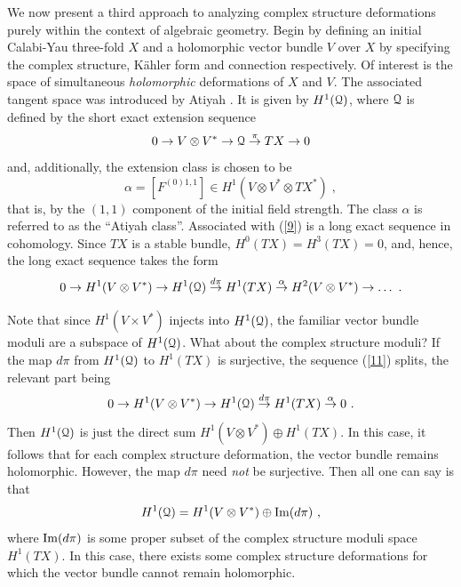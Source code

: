 \documentclass[12pt]{article}
\numberwithin{equation}{section}
\begin{document}
We now present a third approach to analyzing complex structure deformations purely within the context of algebraic geometry. Begin by defining an initial Calabi-Yau three-fold $X$ and a holomorphic vector bundle $V$ over $X$ by specifying the complex structure, K\"ahler form and connection  respectively. Of interest is the space of simultaneous {\it holomorphic} deformations of $X$ and $V$. The associated tangent space  was introduced by Atiyah \cite{Atiyah}.  It is given by $H^{1}({\cal{Q}})$, where $\cal{Q}$ is defined by the short exact extension sequence
%
\begin{equation}
0 \to V\otimes V^* \to {\cal Q} \stackrel{\pi}{\to} TX \to 0 
\label{9}
\end{equation}
%
and, additionally, the extension class is chosen to be
\begin{equation}
\alpha=[F^{(0)1,1}] \in H^1(V\otimes V^* \otimes TX^*)\; ,
\label{10}
\end{equation}
%
that is, by the $(1,1)$ component of the initial field strength. The class $\alpha$ is referred to as the ``Atiyah class''. Associated with (\ref{9}) is a long exact sequence in cohomology. Since $TX$ is a stable bundle, $H^0(TX)=H^3(TX)=0$, and, hence, the long exact sequence takes the form
%
\begin{equation}
0 \to H^1(V\otimes V^*) \to H^1({\cal Q}) \stackrel{d\pi}{\to} H^1(TX) \stackrel{\alpha}{\to} H^2(V\otimes V^*) \to \ldots  \ .
\label{11}
\end{equation}
%

Note that since $H^1(V\times V^*)$ injects into $H^1({\cal Q})$, the familiar vector bundle moduli are a subspace of $H^1({\cal Q})$. What about the complex structure moduli? If the map $d\pi$ from $H^1({\cal Q})$ to $H^1(TX)$ is surjective, the sequence (\ref{11}) splits, the relevant part being 
%
\begin{equation}
0 \to H^1(V\otimes V^*) \to H^1({\cal Q}) \stackrel{d\pi}{\to} H^1(TX) \stackrel{\alpha}{\to} 0 \ .
\label{12}
\end{equation}
%
Then $H^1({\cal Q})$ is just the direct sum $H^1(V\otimes V^*) \oplus H^1(TX)$. In this case, it follows that for each complex structure deformation, the vector bundle remains holomorphic. However, the map $d\pi$ need {\it not} be surjective. Then all one can say is that
%
\begin{equation}
H^1({\cal Q})=H^1(V\otimes V^*) \oplus {\rm Im}(d\pi) \ ,
\label{13}
\end{equation}
%
where ${\rm Im}(d\pi)$ is some proper subset of the complex structure moduli space $H^1(TX)$. In this case, there exists some complex structure deformations for which the vector bundle cannot remain holomorphic.
\end{document}
